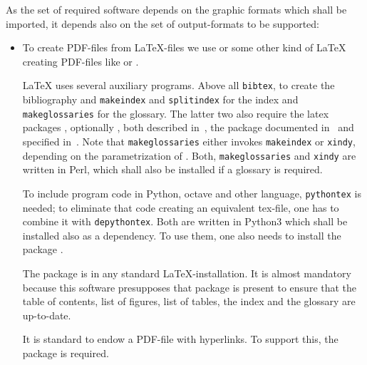 As the set of required software depends on the graphic formats 
which shall be imported, 
it depends also on the set of output-formats 
to be supported: 
%
\begin{itemize}
\item
To create PDF-files from \LaTeX-files we use \lualatex{} 
or some other kind of \LaTeX{} creating PDF-files 
like \xelatex{} or \pdflatex{}. 

\LaTeX{} uses several auxiliary programs. 
Above all \texttt{bibtex}, to create the bibliography 
and \texttt{makeindex} and \texttt{splitindex} for the index 
and \texttt{makeglossaries} for the glossary. 
The latter two 
also require the latex packages , optionally , 
both described in~\cite{MkidxShIdxP}, 
the package  documented in~\cite{SplitidxP}
and  specified in~\cite{GloP4_54}. 
Note that \texttt{makeglossaries} either invokes \texttt{makeindex} 
or \texttt{xindy}, depending on the parametrization of . 
Both, \texttt{makeglossaries} and \texttt{xindy} are written in Perl, 
which shall also be installed if a glossary is required. 

To include program code in Python, octave and other language, 
\texttt{pythontex} is needed; to eliminate that code creating an equivalent tex-file, 
one has to combine it with \texttt{depythontex}. 
Both are written in Python3 which shall be installed also as a dependency. 
To use them, one also needs to install the package . 

The package  is in any standard \LaTeX-installation. 
It is almost mandatory 
because this software presupposes that package is present  
to ensure that the table of contents, list of figures, list of tables, 
the index and the glossary are up-to-date. 

It is standard to endow a PDF-file with hyperlinks. 
To support this, the package  is required. 


\end{itemize}
